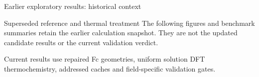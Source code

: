 \begin{frame}{Earlier exploratory results: historical context}
  \begin{block}{Superseded reference and thermal treatment}
    The following figures and benchmark summaries retain the earlier calculation
    snapshot. They are not the updated candidate results or the current validation verdict.
  \end{block}
  \vspace{1ex}
  Current results use repaired Fc geometries, uniform solution DFT thermochemistry,
  addressed caches and field-specific validation gates.
\end{frame}


